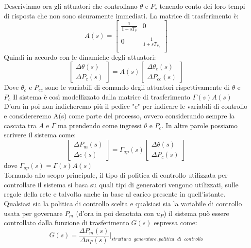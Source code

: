 Descriviamo ora gli attuatori che controllano $\theta$ e $P_c$ tenendo conto dei loro tempi di risposta che non sono sicuramente immediati. La matrice di trasferimento è:
$$A(s)=\left[\begin{array}{cc}
\frac{1}{1+sT_{\theta}} & 0\\
\\
0 & \frac{1}{1+sT_{P_c}}\\
\end{array}\right]$$
Quindi in accordo con le dinamiche degli attuatori:
$$\left[\begin{array}{c}
\Delta\theta(s)\\
\Delta P_c(s)
\end{array}\right]=A(s)\left[\begin{array}{c}
\Delta\theta_c(s)\\
\Delta P_{cc}(s)
\end{array}\right]$$
Dove $\theta_c$ e $P_{cc}$ sono le variabili di comando degli attuatori rispettivamente di $\theta$ e $P_c$
Il sistema è così modellizzato dalla matrice di trasferimento $\Gamma(s)A(s)$\\
D'ora in poi non indicheremo più il pedice "c" per indicare le variabili di controllo e considereremo A(s) come parte del processo, ovvero considerando sempre la cascata tra $A$ e $\Gamma$ ma prendendo come ingressi $\theta$ e $P_c$. In altre parole possiamo scrivere il sistema come:
$$
\left[\begin{array}{c}
\Delta P_m(s)\\ \Delta e(s)
\end{array}\right] 
= \Gamma_{ap}(s)
\left[\begin{array}{c}
\Delta\theta(s)\\ \Delta P_c(s)
\end{array}\right]
$$
dove $\Gamma_{ap}(s)=\Gamma(s)A(s)$\\

Tornando allo scopo principale, il tipo di politica di controllo utilizzata per controllare il sistema si basa su quali tipi di generatori vengono utilizzati, sulle regole della rete e talvolta anche in base al carico presente in quell'istante.
Qualsiasi sia la politica di controllo scelta e qualsiasi sia la variabile di controllo usata per governare $P_m$ (d'ora in poi denotata con $u_P$) il sistema può essere controllato dalla funzione di trasferimento $G(s)$ espressa come:
$$G(s)= \frac{\Delta P_m(s)}{\Delta u_P(s)}\Bigg|_{struttura_-generatore,politica_-di_- controllo}$$

